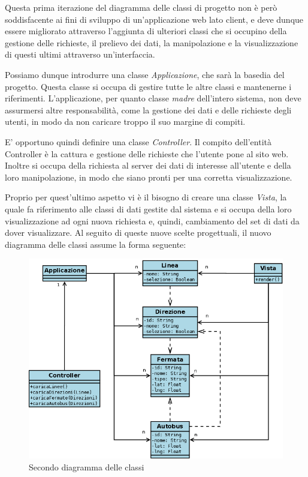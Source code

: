 Questa prima iterazione del diagramma delle classi di progetto non è però soddisfacente ai fini di sviluppo di un'applicazione web lato client, e deve dunque essere migliorato attraverso l'aggiunta di ulteriori classi che si occupino della gestione delle richieste, il prelievo dei dati, la manipolazione e la visualizzazione di questi ultimi attraverso un'interfaccia.

Possiamo dunque introdurre una classe {\itshape Applicazione}, che sarà la basedia del progetto. Questa classe si occupa di gestire tutte le altre classi e mantenerne i riferimenti.
L'applicazione, per quanto classe {\itshape madre} dell'intero sistema, non deve assurmersi altre responsabilità, come la gestione dei dati e delle richieste degli utenti, in modo da non caricare troppo il suo margine di compiti.

E' opportuno quindi definire una classe {\itshape Controller}. Il compito dell'entità Controller è la cattura e gestione delle richieste che l'utente pone al sito web. Inoltre si occupa della richiesta al server dei dati di interesse all'utente e della loro manipolazione, in modo che siano pronti per una corretta visualizzazione.

Proprio per quest'ultimo aspetto vi è il bisogno di creare una classe {\itshape Vista}, la quale fa riferimento alle classi di dati gestite dal sistema e si occupa della loro visualizzazione ad ogni nuova richiesta e, quindi, cambiamento del set di dati da dover visualizzare.
\newpage
Al seguito di queste nuove scelte progettuali, il nuovo diagramma delle classi assume la forma seguente:

\vspace{1cm}
\begin{figure}[htbp]
\begin{center}
\includegraphics[width=13cm]{contents/images/dcd2}
\end{center}
\caption{Secondo diagramma delle classi}
\label{fig:placeholder}
\end{figure}
\vspace{1cm}

